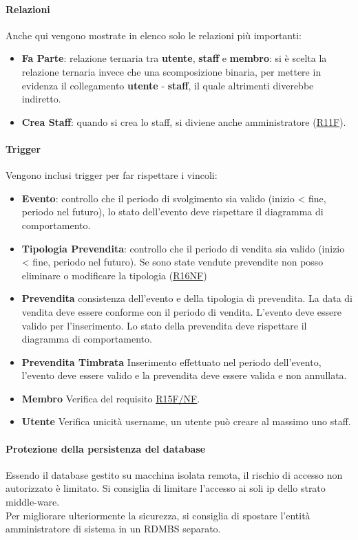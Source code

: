 \documentclass[a4paper]{article}
\begin{document}
\paragraph{Relazioni} Anche qui vengono mostrate in elenco solo le relazioni più importanti:
\begin{itemize}
    \item \textbf{Fa Parte}: relazione ternaria tra \textbf{utente}, \textbf{staff} e \textbf{membro}: si è scelta la relazione ternaria invece che una scomposizione binaria, per mettere in evidenza il collegamento \textbf{utente} - \textbf{staff}, il quale altrimenti diverebbe indiretto.
    \item \textbf{Crea Staff}: quando si crea lo staff, si diviene anche amministratore (\hyperlink{R11F}{R11F}).
\end{itemize}

\paragraph{Trigger} Vengono inclusi trigger per far rispettare i vincoli:

\begin{itemize}
    \item \textbf{Evento}: controllo che il periodo di svolgimento sia valido (inizio < fine, periodo nel futuro), lo stato dell'evento deve rispettare il diagramma di comportamento.
    \item \textbf{Tipologia Prevendita}: controllo che il periodo di vendita sia valido (inizio < fine, periodo nel futuro). Se sono state vendute prevendite non posso eliminare o modificare la tipologia (\hyperlink{R16NF}{R16NF})
    \item \textbf{Prevendita} consistenza dell'evento e della tipologia di prevendita. La data di vendita deve essere conforme con il periodo di vendita. L'evento deve essere valido per l'inserimento. Lo stato della prevendita deve rispettare il diagramma di comportamento.
    \item \textbf{Prevendita Timbrata} Inserimento effettuato nel periodo dell'evento, l'evento deve essere valido e la prevendita deve essere valida e non annullata.
    \item \textbf{Membro} Verifica del requisito \hyperlink{R15F/NF}{R15F/NF}.
    \item \textbf{Utente} Verifica unicità username, un utente può creare al massimo uno staff.
\end{itemize}

\paragraph{Protezione della persistenza del database} Essendo il database gestito su macchina isolata remota, il rischio di accesso non autorizzato è limitato. Si consiglia di limitare l'accesso ai soli ip dello strato middle-ware.\\Per migliorare ulteriormente la sicurezza, si consiglia di spostare l'entità amministratore di sistema in un RDMBS separato.
\end{document}
